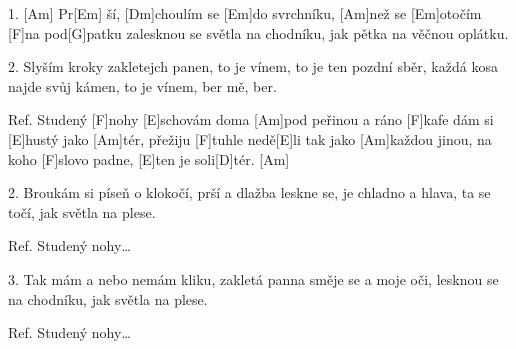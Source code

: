 
1. [Am] Pr[Em] ší, [Dm]choulím se [Em]do svrchníku,
[Am]než se [Em]otočím [F]na pod[G]patku
zalesknou se světla na chodníku,
jak pětka na věčnou oplátku.

2. Slyším kroky zakletejch panen,
to je vínem, to je ten pozdní sběr,
každá kosa najde svůj kámen,
to je vínem, ber mě, ber.

Ref. Studený [F]nohy [E]schovám doma [Am]pod peřinou
a ráno [F]kafe dám si [E]hustý jako [Am]tér,
přežiju [F]tuhle nedě[E]li tak jako [Am]každou jinou,
na koho [F]slovo padne, [E]ten je soli[D]tér. [Am]

2. Broukám si píseň o klokočí,
prší a dlažba leskne se,
je chladno a hlava, ta se točí,
jak světla na plese.

Ref. Studený nohy…

3. Tak mám a nebo nemám kliku,
zakletá panna směje se
a moje oči, lesknou se na chodníku,
jak světla na plese.

Ref. Studený nohy…

